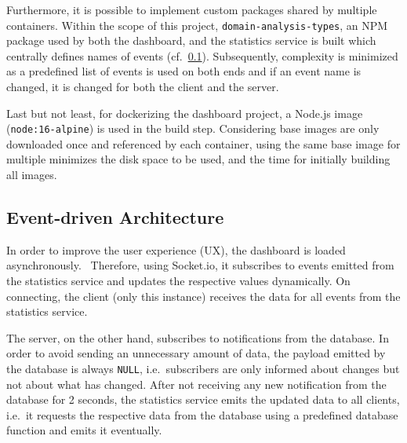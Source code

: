 Furthermore, it is possible to implement custom packages shared by multiple containers.
Within the scope of this project, \texttt{domain-analysis-types}, an NPM package used by both the dashboard, and the statistics service is built which centrally defines names of events (cf.~\ref{subsec:event-driven-architecture}).
Subsequently, complexity is minimized as a predefined list of events is used on both ends and if an event name is changed, it is changed for both the client and the server.

Last but not least, for dockerizing the dashboard project, a Node.js image (\texttt{node:16-alpine}) is used in the build step.
Considering base images are only downloaded once and referenced by each container, using the same base image for multiple minimizes the disk space to be used, and the time for initially building all images.~\autocite[cf.][pp. 8-9]{Arundel.2019}

\subsection{Event-driven Architecture}\label{subsec:event-driven-architecture}

In order to improve the user experience (UX), the dashboard is loaded asynchronously.~\autocite[cf.][]{Shah.2021}
Therefore, using Socket.io, it subscribes to events emitted from the statistics service and updates the respective values dynamically.
On connecting, the client (only this instance) receives the data for all events from the statistics service.

The server, on the other hand, subscribes to notifications from the database.
In order to avoid sending an unnecessary amount of data, the payload emitted by the database is always \texttt{NULL}, i.e.\ subscribers are only informed about changes but not about what has changed.
After not receiving any new notification from the database for 2 seconds, the statistics service emits the updated data to all clients, i.e.\ it requests the respective data from the database using a predefined database function and emits it eventually.
